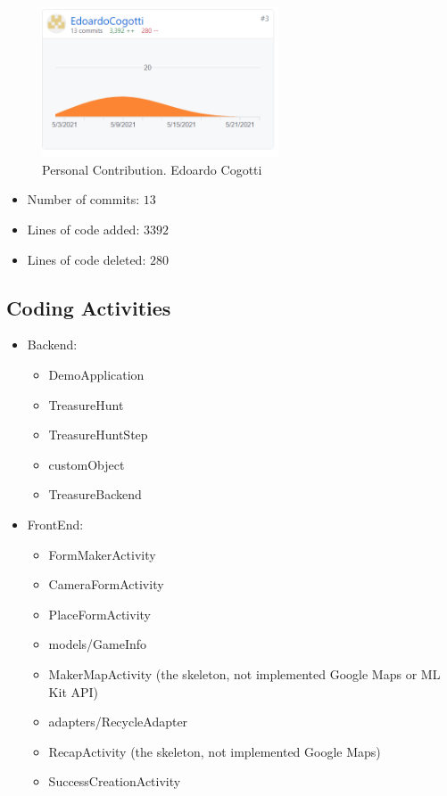 \documentclass{article}
\begin{document}
\begin{figure}[h!]
\centering
\includegraphics[width=7cm]{img/ec.PNG}
\caption{Personal Contribution. Edoardo Cogotti}
\label{fig:universe}
\end{figure}

\begin{itemize}
    \item Number of commits: \(13\)
    \item Lines of code added: \(3392\)
    \item Lines of code deleted: \(280\)
\end{itemize}

\subsection{Coding Activities}

\begin{itemize}
    \item Backend:
    \begin{itemize}
        \item DemoApplication
        \item TreasureHunt
        \item TreasureHuntStep
        \item customObject
        \item TreasureBackend
    \end{itemize}
\end{itemize}


\begin{itemize}
\item FrontEnd:
    \begin{itemize}
    \item FormMakerActivity
    \item CameraFormActivity
    \item PlaceFormActivity
    \item models/GameInfo
    \item MakerMapActivity (the skeleton, not implemented Google Maps or ML Kit API)
    \item adapters/RecycleAdapter
    \item RecapActivity (the skeleton, not implemented Google Maps)
    \item SuccessCreationActivity 
    \end{itemize}
\end{itemize}
\end{document}
